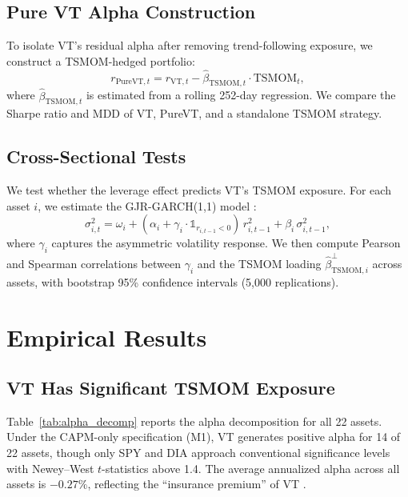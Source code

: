 \documentclass[12pt,a4paper]{article}
\begin{document}
\subsection{Pure VT Alpha Construction}

To isolate VT's residual alpha after removing trend-following exposure, we construct a TSMOM-hedged portfolio:
\begin{equation}
r_{\text{PureVT},t} = r_{\text{VT},t} - \hat{\beta}_{\text{TSMOM},t} \cdot \text{TSMOM}_t,
\label{eq:pure_vt}
\end{equation}
where $\hat{\beta}_{\text{TSMOM},t}$ is estimated from a rolling 252-day regression. We compare the Sharpe ratio and MDD of VT, PureVT, and a standalone TSMOM strategy.

\subsection{Cross-Sectional Tests}

We test whether the leverage effect predicts VT's TSMOM exposure. For each asset $i$, we estimate the GJR-GARCH(1,1) model \citep{glosten1993}:
\begin{equation}
\sigma_{i,t}^2 = \omega_i + (\alpha_i + \gamma_i \cdot \mathbb{1}_{r_{i,t-1}<0}) \, r_{i,t-1}^2 + \beta_i \, \sigma_{i,t-1}^2,
\label{eq:gjr}
\end{equation}
where $\gamma_i$ captures the asymmetric volatility response. We then compute Pearson and Spearman correlations between $\gamma_i$ and the TSMOM loading $\hat{\beta}_{\text{TSMOM},i}^{\perp}$ across assets, with bootstrap 95\% confidence intervals (5,000 replications).


\section{Empirical Results}

\subsection{VT Has Significant TSMOM Exposure}

Table~\ref{tab:alpha_decomp} reports the alpha decomposition for all 22 assets. Under the CAPM-only specification (M1), VT generates positive alpha for 14 of 22 assets, though only SPY and DIA approach conventional significance levels with Newey--West $t$-statistics above 1.4. The average annualized alpha across all assets is $-0.27\%$, reflecting the ``insurance premium'' of VT \citep{lai2026a}.
\end{document}
